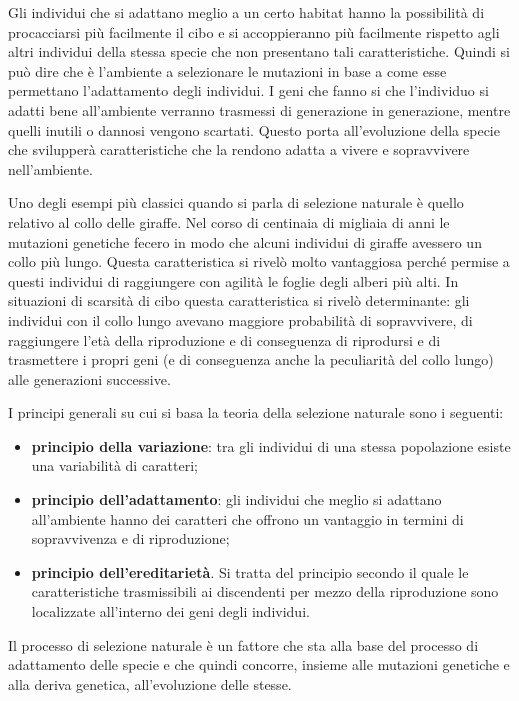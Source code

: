 \documentclass[11pt]{article}
\begin{document}
Gli individui che si adattano meglio a un certo habitat hanno la possibilità di procacciarsi più facilmente il cibo e si accoppieranno più facilmente rispetto agli altri individui della stessa specie che non presentano tali caratteristiche. Quindi si può dire che è l'ambiente a selezionare le mutazioni in base a come esse permettano l'adattamento degli individui. I geni che fanno si che l'individuo si adatti bene all'ambiente verranno trasmessi di generazione in generazione, mentre quelli inutili o dannosi vengono scartati. Questo porta all'evoluzione della specie che svilupperà caratteristiche che la rendono adatta a vivere e sopravvivere nell'ambiente. 

Uno degli esempi più classici quando si parla di selezione naturale è quello relativo al collo delle giraffe. Nel corso di centinaia di migliaia di anni le mutazioni genetiche fecero in modo che alcuni individui di giraffe avessero un collo più lungo. Questa caratteristica si rivelò molto vantaggiosa perché permise a questi individui di raggiungere con agilità le foglie degli alberi più alti. In situazioni di scarsità di cibo questa caratteristica si rivelò determinante: gli individui con il collo lungo avevano maggiore probabilità di sopravvivere, di raggiungere l'età della riproduzione e di conseguenza di riprodursi e di trasmettere i propri geni (e di conseguenza anche la peculiarità del collo lungo) alle generazioni successive. 

I principi generali su cui si basa la teoria della selezione naturale sono i seguenti:
\begin{itemize}
    \item \textbf{principio della variazione}: tra gli individui di una stessa popolazione esiste una variabilità di caratteri;
    \item \textbf{principio dell'adattamento}: gli individui che meglio si adattano all'ambiente hanno dei caratteri che offrono un vantaggio in termini di sopravvivenza e di riproduzione;
    \item \textbf{principio dell'ereditarietà}. Si tratta del principio secondo il quale le caratteristiche trasmissibili ai discendenti per mezzo della riproduzione sono localizzate all'interno dei geni degli individui. 
\end{itemize}

Il processo di selezione naturale è un fattore che sta alla base del processo di adattamento delle specie e che quindi concorre, insieme alle mutazioni genetiche e alla deriva genetica, all'evoluzione delle stesse.
\end{document}
